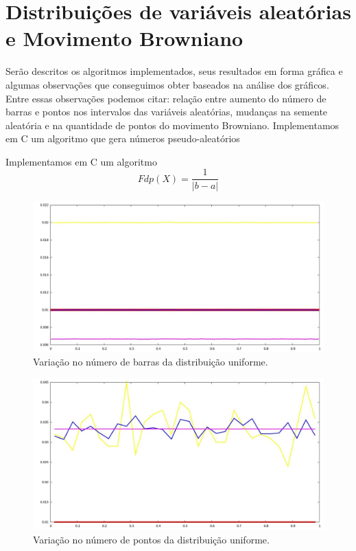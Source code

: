 \chapter*{Distribuições de variáveis aleatórias e Movimento Browniano}
Serão descritos os algoritmos implementados, seus resultados em forma gráfica e algumas observações que conseguimos obter baseados na análise dos gráficos. Entre essas observações podemos citar: relação entre aumento do número de barras e pontos nos intervalos das variáveis aleatórias, mudanças na semente aleatória e na quantidade de pontos do movimento Browniano. Implementamos em C um algoritmo que gera números pseudo-aleatórios %

Implementamos em C um algoritmo %
\begin{equation}
Fdp(X) = \frac{1}{|b-a|}
\end{equation}
\begin{figure}[!htb]
\centering
\begin{minipage}[b]{0.9\linewidth}
\includegraphics[width=\linewidth]{./img/Distribuicoes/uniVarNumBar.jpg}
\caption{Variação no número de barras da distribuição uniforme.}
\label{figUniformeBar}
\end{minipage} \hfill
\end{figure}
\begin{figure}[!htb]
\centering
\begin{minipage}[b]{0.9\linewidth}
\includegraphics[width=\linewidth]{./img/Distribuicoes/uniVarNumPts.jpg}
\caption{Variação no número de pontos da distribuição uniforme.}
\label{figUniformePt}
\end{minipage} \hfill
\end{figure}


